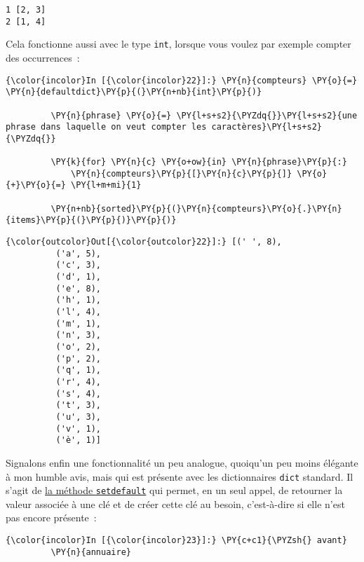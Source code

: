     \begin{Verbatim}[commandchars=\\\{\},frame=single,framerule=0.3mm,rulecolor=\color{cellframecolor}]
1 [2, 3]
2 [1, 4]
\end{Verbatim}

    Cela fonctionne aussi avec le type \texttt{int}, lorsque vous voulez par
exemple compter des occurrences~:

    \begin{Verbatim}[commandchars=\\\{\},frame=single,framerule=0.3mm,rulecolor=\color{cellframecolor}]
{\color{incolor}In [{\color{incolor}22}]:} \PY{n}{compteurs} \PY{o}{=} \PY{n}{defaultdict}\PY{p}{(}\PY{n+nb}{int}\PY{p}{)}
         
         \PY{n}{phrase} \PY{o}{=} \PY{l+s+s2}{\PYZdq{}}\PY{l+s+s2}{une phrase dans laquelle on veut compter les caractères}\PY{l+s+s2}{\PYZdq{}}
         
         \PY{k}{for} \PY{n}{c} \PY{o+ow}{in} \PY{n}{phrase}\PY{p}{:}
             \PY{n}{compteurs}\PY{p}{[}\PY{n}{c}\PY{p}{]} \PY{o}{+}\PY{o}{=} \PY{l+m+mi}{1}
         
         \PY{n+nb}{sorted}\PY{p}{(}\PY{n}{compteurs}\PY{o}{.}\PY{n}{items}\PY{p}{(}\PY{p}{)}\PY{p}{)}
\end{Verbatim}


\begin{Verbatim}[commandchars=\\\{\},frame=single,framerule=0.3mm,rulecolor=\color{cellframecolor}]
{\color{outcolor}Out[{\color{outcolor}22}]:} [(' ', 8),
          ('a', 5),
          ('c', 3),
          ('d', 1),
          ('e', 8),
          ('h', 1),
          ('l', 4),
          ('m', 1),
          ('n', 3),
          ('o', 2),
          ('p', 2),
          ('q', 1),
          ('r', 4),
          ('s', 4),
          ('t', 3),
          ('u', 3),
          ('v', 1),
          ('è', 1)]
\end{Verbatim}
            
    Signalons enfin une fonctionnalité un peu analogue, quoiqu'un peu moins
élégante à mon humble avis, mais qui est présente avec les dictionnaires
\texttt{dict} standard. Il s'agit de
\href{https://docs.python.org/3/library/stdtypes.html\#dict.setdefault}{la
méthode \texttt{setdefault}} qui permet, en un seul appel, de retourner
la valeur associée à une clé et de créer cette clé au besoin,
c'est-à-dire si elle n'est pas encore présente~:

    \begin{Verbatim}[commandchars=\\\{\},frame=single,framerule=0.3mm,rulecolor=\color{cellframecolor}]
{\color{incolor}In [{\color{incolor}23}]:} \PY{c+c1}{\PYZsh{} avant}
         \PY{n}{annuaire}
\end{Verbatim}


